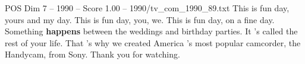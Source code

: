 \begin{textsample}{POS Dim 7 – 1990 – Score 1.00 – 1990/tv\_com\_1990\_89.txt}  \label{ex:f7_pos_065}
This is fun day, yours and my day.
This is fun day, you, we.
This is fun day, on a fine day.
Something \textbf{happens} between the weddings and birthday parties.
It 's called the rest of your life.
That 's why we created America 's most popular camcorder, the Handycam, from Sony.
Thank you for watching.

\end{textsample}
